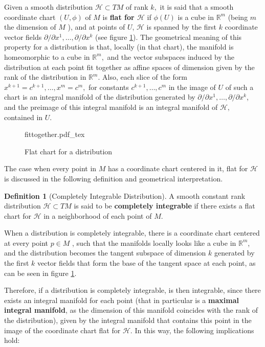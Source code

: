 \documentclass[12pt, letterpaper, reqno]{amsart}
\newcommand{\incfig}[2][1]{%
    \def\svgwidth{#1\columnwidth}
    {#2.pdf_tex}
}
\theoremstyle{definition}
\newtheorem{df}{Definition}
\theoremstyle{plain}
\theoremstyle{remark}
\begin{document}
Given a smooth distribution $ \mathcal{H}\subset TM $  of rank $ k, $ it is said that a smooth coordinate chart $ (U,\phi) $ of $ M $ is \textbf{flat for $ \mathcal{H} $ } if $ \phi(U) $ is a cube in $ \mathbb{R}^m  $ (being $ m $ the dimension of $ M $ ), and at points of $ U $, $ \mathcal{H} $ is spanned by the first $ k $ coordinate vector fields $ \partial/\partial x^1,\dots,\partial/\partial x^k $ (see figure \ref{fig:fittogether}). The geometrical meaning of this property for a distribution is that, locally (in that chart), the manifold is homeomorphic to a cube in $ \mathbb{R}^m,  $ and the vector subspaces induced by the distribution at each point fit together as affine spaces of dimension given by the rank of the distribution in $ \mathbb{R}^m $. Also, each slice of the form $ x^{k+1}=c^{k+1},\dots, x^m=c^m,$ for constants $ c^{k+1}, \dots, c^m $ in the image of $ U $ of such a chart is an integral manifold of the distribution generated by $ \partial/\partial x^1,\dots,\partial/\partial x^k $, and the preimage of this integral manifold is an integral manifold of $ \mathcal{H}, $ contained in $ U. $  

\begin{figure}
    \centering
    \incfig{fittogether}
    \caption{Flat chart for a distribution}
    \label{fig:fittogether}
\end{figure}

The case when every point in $ M $ has a coordinate chart centered in it, flat for $ \mathcal{H} $ is discussed in the following definition and geometrical interpretation.

\begin{df}[Completely Integrable Distribution]
	A smooth constant rank distribution $ \mathcal{H}\subset TM $  is said to be \textbf{completely integrable} if there exists a flat chart for $ \mathcal{H} $ in a neighborhood of each point of $ M. $ 
\end{df}

When a distribution is completely integrable, there is a coordinate chart centered at every point $ p\in M $ , such that the manifolds locally looks like a cube in $ \mathbb{R}^m  $, and the distribution becomes the tangent subspace of dimension $ k $ generated by the first $ k $ vector fields that form the base of the tangent space at each point, as can be seen in figure \ref{fig:fittogether}. 

Therefore, if a distribution is completely integrable, is then integrable, since there exists an integral manifold for each point (that in particular is a \textbf{maximal integral manifold}, as the dimension of this manifold coincides with the rank of the distribution), given by the integral manifold that contains this point in the image of the coordinate chart flat for $ \mathcal{H}. $ In this way, the following implications hold: 
\end{document}

